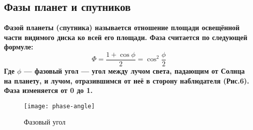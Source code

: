 \subsection{Фазы планет и спутников}

\bfseries Фазой \mdseries планеты (cпутника) называется отношение площади освещённой  части видимого диска ко всей его площади.
Фаза считается по следующей формуле:
$$\Phi=\frac{1+\cos\phi}{2}=\cos^2\frac{\phi}{2}$$
Где $\phi$ --- \textbf{фазовый угол} --- угол между лучом света, падающим от Солнца на планету, и лучом, отразившимся от неё в сторону наблюдателя (Рис.6). Фаза изменяется от 0 до 1.
\begin{figure}[h!]
\texttt{[image: phase-angle]}
\caption{Фазовый угол}
\end{figure}
